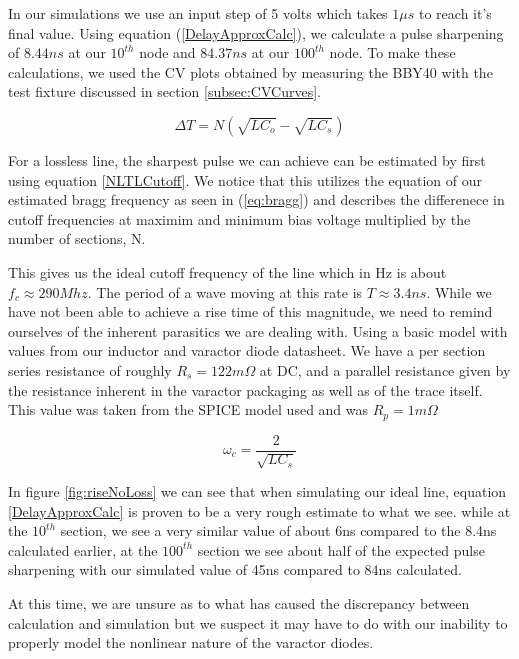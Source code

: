 \documentclass[journal]{IEEEtran} \usepackage[english]{babel}
\begin{document}
In our simulations we use an input step of 5 volts which takes $1\mu s$ to reach
it's final value. Using equation (\ref{DelayApproxCalc}), we calculate a pulse
sharpening of $8.44ns$ at our $10^{th}$ node and $84.37ns$ at our $100^{th}$
node. To make these calculations, we used the CV plots obtained by measuring the
BBY40 with the test fixture discussed in section \ref{subsec:CVCurves}.


\begin{equation} \label{DelayApproxCalc}
    \Delta T = N(\sqrt{LC_{o}} - \sqrt{LC_{s}} )
\end{equation}

For a lossless line, the sharpest pulse we can achieve can be estimated by first
using equation \ref{NLTLCutoff}\cite{wilson1991pulse}.
We notice that this utilizes the equation of our estimated bragg frequency as
seen in (\ref{eq:bragg}) and describes the differenece in cutoff
frequencies at maximim and minimum bias voltage multiplied by the number of
sections, N. 

 This gives us the ideal cutoff frequency of the line which in Hz is about $f_c
 \approx 290Mhz$. The period of a wave moving at this rate is $T \approx 3.4ns$.
 While we have not been able to achieve a rise time of this magnitude, we need
 to remind ourselves of the inherent parasitics we are dealing with. Using a
 basic model
with values from our inductor and varactor diode datasheet. We have a per
section series resistance of roughly $R_s = 122m\Omega$ at DC, and a parallel
resistance given by the resistance inherent in the varactor packaging as well as
of the trace itself. This value was taken from the SPICE model used and was
$R_{p} = 1m\Omega$



\begin{equation} \label{NLTLCutoff}
    \omega_{c} = \frac{2}{\sqrt{ LC_{s} } }
\end{equation}

In figure \ref{fig:riseNoLoss} we can see that when simulating our ideal line,
equation \ref{DelayApproxCalc} is proven to be a very rough estimate to what we
see. while at the $10^{th}$ section, we see a very similar value of about 6ns
compared to the 8.4ns calculated earlier, at the $100^{th}$ section we see about
half of the expected pulse sharpening with our simulated value of 45ns compared
to 84ns calculated.

At this time, we are unsure as to what has caused the discrepancy between
calculation and simulation but we suspect it may have to do with our inability
to properly model the nonlinear nature of the varactor diodes.
\end{document}
